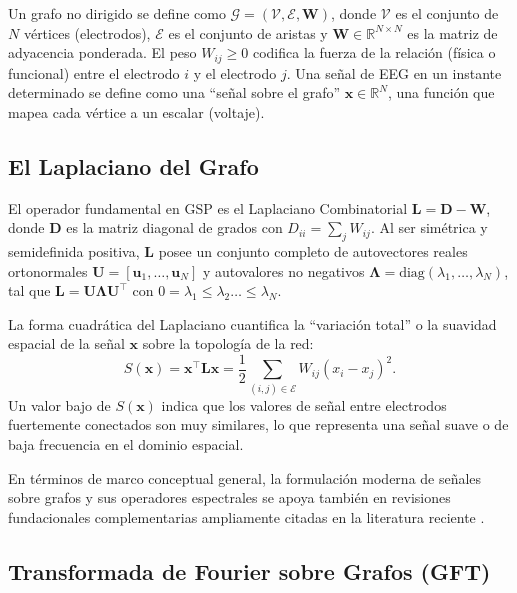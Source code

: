 Un grafo no dirigido se define como $\mathcal{G} = (\mathcal{V}, \mathcal{E}, \mathbf{W})$, donde $\mathcal{V}$ es el conjunto de $N$ vértices (electrodos), $\mathcal{E}$ es el conjunto de aristas y $\mathbf{W} \in \mathbb{R}^{N \times N}$ es la matriz de adyacencia ponderada. El peso $W_{ij} \ge 0$ codifica la fuerza de la relación (física o funcional) entre el electrodo $i$ y el electrodo $j$. Una señal de EEG en un instante determinado se define como una ``señal sobre el grafo'' $\mathbf{x} \in \mathbb{R}^N$, una función que mapea cada vértice a un escalar (voltaje).

\subsection{El Laplaciano del Grafo}

El operador fundamental en GSP es el Laplaciano Combinatorial $\mathbf{L} = \mathbf{D} - \mathbf{W}$, donde $\mathbf{D}$ es la matriz diagonal de grados con $D_{ii} = \sum_j W_{ij}$. Al ser simétrica y semidefinida positiva, $\mathbf{L}$ posee un conjunto completo de autovectores reales ortonormales $\mathbf{U} = [\mathbf{u}_1, \dots, \mathbf{u}_N]$ y autovalores no negativos $\boldsymbol{\Lambda} = \text{diag}(\lambda_1, \dots, \lambda_N)$, tal que $\mathbf{L} = \mathbf{U} \boldsymbol{\Lambda} \mathbf{U}^\top$ con $0 = \lambda_1 \le \lambda_2 \dots \le \lambda_N$.

La forma cuadrática del Laplaciano cuantifica la ``variación total'' o la suavidad espacial de la señal $\mathbf{x}$ sobre la topología de la red:
\begin{equation}
    S(\mathbf{x}) = \mathbf{x}^\top \mathbf{L} \mathbf{x} = \frac{1}{2} \sum_{(i,j) \in \mathcal{E}} W_{ij} (x_i - x_j)^2.
    \label{eq:smoothness}
\end{equation}
Un valor bajo de $S(\mathbf{x})$ indica que los valores de señal entre electrodos fuertemente conectados son muy similares, lo que representa una señal suave o de baja frecuencia en el dominio espacial.

En términos de marco conceptual general, la formulación moderna de señales sobre grafos y sus operadores espectrales se apoya también en revisiones fundacionales complementarias ampliamente citadas en la literatura reciente \cite{ortega_graph_2018}.

\subsection{Transformada de Fourier sobre Grafos (GFT)}

